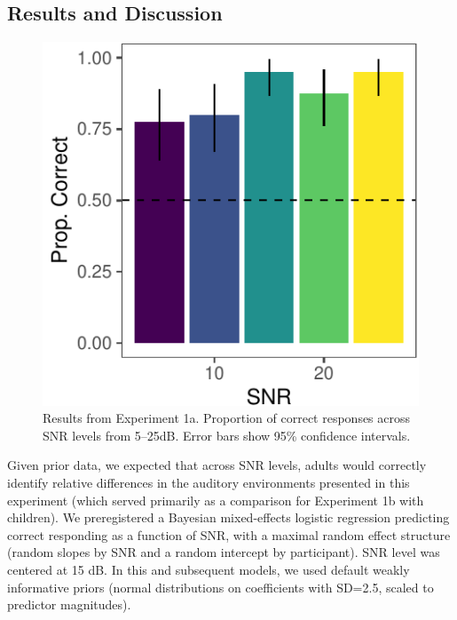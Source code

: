 \documentclass[10pt, letterpaper]{article}
\newenvironment{CodeChunk}{}{}
\begin{document}
\hypertarget{results-and-discussion}{%
\subsection{Results and Discussion}\label{results-and-discussion}}

\begin{CodeChunk}
\begin{figure}[t]

{\centering \includegraphics{figs/e1a-bar-1} 

}

\caption[Results from Experiment 1a]{Results from Experiment 1a. Proportion of correct responses across SNR levels from 5--25dB. Error bars show 95\% confidence intervals.}\label{fig:e1a-bar}
\end{figure}
\end{CodeChunk}

Given prior data, we expected that across SNR levels, adults would
correctly identify relative differences in the auditory environments
presented in this experiment (which served primarily as a comparison for
Experiment 1b with children). We preregistered a Bayesian mixed-effects
logistic regression predicting correct responding as a function of SNR,
with a maximal random effect structure (random slopes by SNR and a
random intercept by participant). SNR level was centered at 15 dB. In
this and subsequent models, we used default weakly informative priors
(normal distributions on coefficients with SD=2.5, scaled to predictor
magnitudes).
\end{document}
